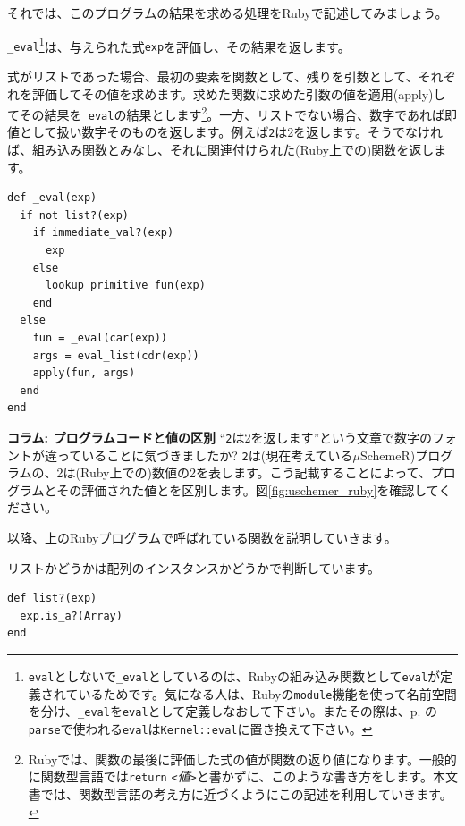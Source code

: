 \setcounter{footnote}{3}

それでは、このプログラムの結果を求める処理をRubyで記述してみましょう。

{\tt \_eval}\footnote{{\tt eval}としないで{\tt \_eval}としているのは、Rubyの組み込み関数として{\tt eval}が定義されているためです。気になる人は、Rubyの{\tt module}機能を使って名前空間を分け、{\tt \_eval}を{\tt eval}として定義しなおして下さい。またその際は、p. \pageref{fun:parse}の{\tt parse}で使われる{\tt eval}は{\tt Kernel::eval}に置き換えて下さい。}は、与えられた式{\tt exp}を評価し、その結果を返します。

式がリストであった場合、最初の要素を関数として、残りを引数として、それぞれを評価してその値を求めます。求めた関数に求めた引数の値を適用(apply)してその結果を{\tt \_eval}の結果とします\footnote{Rubyでは、関数の最後に評価した式の値が関数の返り値になります。一般的に関数型言語では{\tt return} {\it {\tt <}値{\tt >}}と書かずに、このような書き方をします。本文書では、関数型言語の考え方に近づくようにこの記述を利用していきます。}。一方、リストでない場合、数字であれば即値として扱い数字そのものを返します。例えば{\tt 2}は2を返します。そうでなければ、組み込み関数とみなし、それに関連付けられた(Ruby上での)関数を返します。

\begin{lstlisting}
def _eval(exp)
  if not list?(exp) 
    if immediate_val?(exp)
      exp
    else 
      lookup_primitive_fun(exp)
    end
  else
    fun = _eval(car(exp))
    args = eval_list(cdr(exp))
    apply(fun, args)
  end
end
\end{lstlisting}

\begin{breakitembox}[l]{\bf コラム: プログラムコードと値の区別} 
“{\tt 2}は2を返します”という文章で数字のフォントが違っていることに気づきましたか? {\tt 2}は(現在考えている$\mu$SchemeR)プログラムの、2は(Ruby上での)数値の2を表します。こう記載することによって、プログラムとその評価された値とを区別します。図\ref{fig:uschemer_ruby}を確認してください。
\end{breakitembox}

以降、上のRubyプログラムで呼ばれている関数を説明していきます。

リストかどうかは配列のインスタンスかどうかで判断しています。

\begin{lstlisting}
def list?(exp)
  exp.is_a?(Array)
end
\end{lstlisting}

